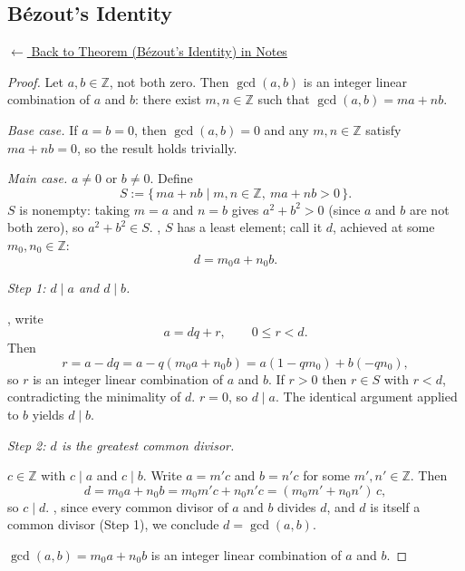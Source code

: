 
\subsection*{Bézout's Identity}
\label{prf:bezout-identity}

\begin{remark*}[Return]
\hyperref[thm:bezout-identity]{$\leftarrow$ Back to Theorem (Bézout's Identity) in Notes}
\end{remark*}

\begin{proof}
\Claim Let $a, b \in \mathbb{Z}$, not both zero. Then $\gcd(a,b)$ is an integer
linear combination of $a$ and $b$: there exist $m, n \in \mathbb{Z}$ such that
$\gcd(a,b) = ma + nb$.

\medskip
\noindent\textit{Base case.}
If $a = b = 0$, then $\gcd(a,b) = 0$ and any $m, n \in \mathbb{Z}$ satisfy
$ma + nb = 0$, so the result holds trivially.

\medskip
\noindent\textit{Main case.}
\Given $a \neq 0$ or $b \neq 0$.
\Strategy Define
\[
    S := \{\, ma + nb \mid m, n \in \mathbb{Z},\ ma + nb > 0 \,\}.
\]
$S$ is nonempty: taking $m = a$ and $n = b$ gives $a^2 + b^2 > 0$ (since $a$
and $b$ are not both zero), so $a^2 + b^2 \in S$.
, $S$ has a least element; call it $d$,
achieved at some $m_0, n_0 \in \mathbb{Z}$:
\[
    d = m_0 a + n_0 b.
\]

\medskip
\noindent\textit{Step 1: $d \mid a$ and $d \mid b$.}

, write
\[
    a = dq + r, \qquad 0 \leq r < d.
\]
Then
\[
    r = a - dq
      = a - q(m_0 a + n_0 b)
      = a(1 - qm_0) + b(-qn_0),
\]
so $r$ is an integer linear combination of $a$ and $b$.
If $r > 0$ then $r \in S$ with $r < d$, contradicting the minimality of $d$.
\Therefore $r = 0$, so $d \mid a$.
The identical argument applied to $b$ yields $d \mid b$.

\medskip
\noindent\textit{Step 2: $d$ is the greatest common divisor.}

\Let $c \in \mathbb{Z}$ with $c \mid a$ and $c \mid b$.
Write $a = m'c$ and $b = n'c$ for some $m', n' \in \mathbb{Z}$. Then
\[
    d = m_0 a + n_0 b
      = m_0 m' c + n_0 n' c
      = (m_0 m' + n_0 n')\,c,
\]
so $c \mid d$.
, since every common divisor of $a$ and $b$
divides $d$, and $d$ is itself a common divisor (Step 1), we conclude
$d = \gcd(a,b)$.

\Hence $\gcd(a,b) = m_0 a + n_0 b$ is an integer linear combination of $a$
and $b$. \AsReq
\end{proof}


